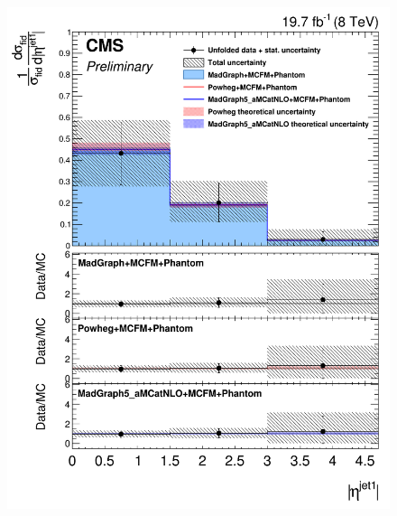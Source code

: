 \begin{figure}[hbtp]
\begin{center}
    \includegraphics[width=\cmsFigWidth]{Figures/DiffCrossSecZZTo2e2mEtaJet1_Unfolded_fr_MadGraph_norm.png}       

\end{center}
\end{figure}
